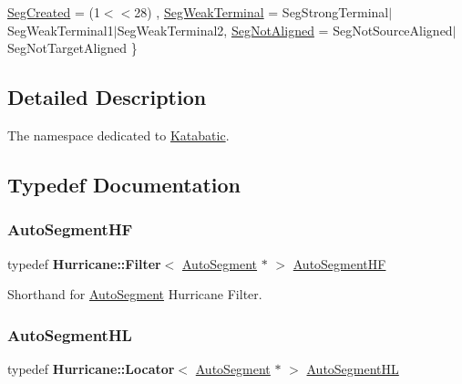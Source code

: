 \begin{DoxyCompactItemize}
\newline
\hyperlink{namespaceKatabatic_a94585537ee1724ea9315578ec54380f4a01513b74d37a8721370cf7b91fb419ad}{Seg\+Created} = (1$<$$<$28)
, \newline
\hyperlink{namespaceKatabatic_a94585537ee1724ea9315578ec54380f4a419e7722198b077c1f71d6c47e2fc2ab}{Seg\+Weak\+Terminal} = Seg\+Strong\+Terminal$\vert$\+Seg\+Weak\+Terminal1$\vert$\+Seg\+Weak\+Terminal2, 
\newline
\hyperlink{namespaceKatabatic_a94585537ee1724ea9315578ec54380f4a637e0426170a532feac45548e009325d}{Seg\+Not\+Aligned} = Seg\+Not\+Source\+Aligned$\vert$\+Seg\+Not\+Target\+Aligned
 \}
\end{DoxyCompactItemize}


\subsection{Detailed Description}
The namespace dedicated to \hyperlink{namespaceKatabatic}{Katabatic}. 

\subsection{Typedef Documentation}
\mbox{\label{namespaceKatabatic_a790418bb65a9a13859868df3e8f53598}} 
\subsubsection{\texorpdfstring{Auto\+Segment\+HF}{AutoSegmentHF}}
{\footnotesize\ttfamily typedef \textbf{ Hurricane\+::\+Filter}$<$ \hyperlink{classKatabatic_1_1AutoSegment}{Auto\+Segment} $\ast$ $>$ \hyperlink{namespaceKatabatic_a790418bb65a9a13859868df3e8f53598}{Auto\+Segment\+HF}}

Shorthand for \hyperlink{classKatabatic_1_1AutoSegment}{Auto\+Segment} Hurricane Filter. \mbox{\label{namespaceKatabatic_a40ef13471fd0e797b75d3c436813fe65}} 
\subsubsection{\texorpdfstring{Auto\+Segment\+HL}{AutoSegmentHL}}
{\footnotesize\ttfamily typedef \textbf{ Hurricane\+::\+Locator}$<$ \hyperlink{classKatabatic_1_1AutoSegment}{Auto\+Segment} $\ast$ $>$ \hyperlink{namespaceKatabatic_a40ef13471fd0e797b75d3c436813fe65}{Auto\+Segment\+HL}}

